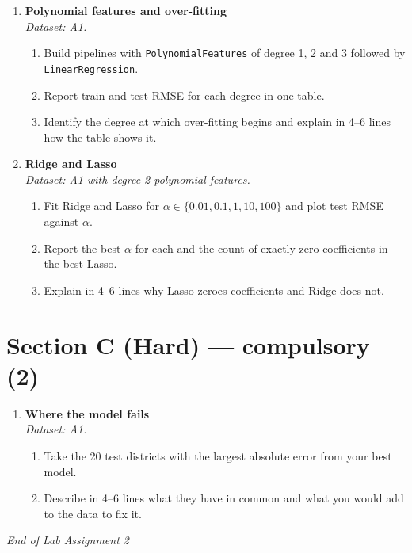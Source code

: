 \documentclass[11pt,a4paper]{article}
\begin{document}
\begin{enumerate}[label=\textbf{B\arabic*.}, leftmargin=*]

  \item \textbf{Polynomial features and over-fitting} \\
    \emph{Dataset: A1.}
    \begin{enumerate}[label=(\alph*), leftmargin=*]
      \item Build pipelines with \texttt{PolynomialFeatures} of degree 1, 2 and 3 followed by \texttt{LinearRegression}.
      \item Report train and test RMSE for each degree in one table.
      \item Identify the degree at which over-fitting begins and explain in 4--6 lines how the table shows it.
    \end{enumerate}

  \item \textbf{Ridge and Lasso} \\
    \emph{Dataset: A1 with degree-2 polynomial features.}
    \begin{enumerate}[label=(\alph*), leftmargin=*]
      \item Fit Ridge and Lasso for $\alpha \in \{0.01, 0.1, 1, 10, 100\}$ and plot test RMSE against $\alpha$.
      \item Report the best $\alpha$ for each and the count of exactly-zero coefficients in the best Lasso.
      \item Explain in 4--6 lines why Lasso zeroes coefficients and Ridge does not.
    \end{enumerate}

\end{enumerate}

\section*{Section C (Hard) --- compulsory \quad (2)}

\begin{enumerate}[label=\textbf{C\arabic*.}, leftmargin=*]

  \item \textbf{Where the model fails} \\
    \emph{Dataset: A1.}
    \begin{enumerate}[label=(\alph*), leftmargin=*]
      \item Take the 20 test districts with the largest absolute error from your best model.
      \item Describe in 4--6 lines what they have in common and what you would add to the data to fix it.
    \end{enumerate}

\end{enumerate}

\vfill\noindent\textit{End of Lab Assignment 2}

\notesources{\AMLLabSources}
\end{document}
